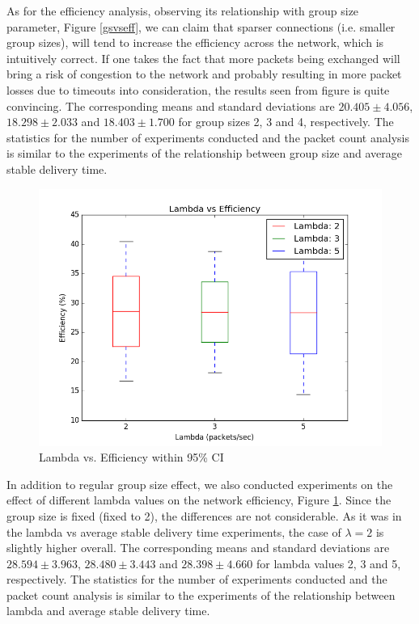 \documentclass[a4paper, 12pt]{article}
\begin{document}
As for the efficiency analysis, observing its relationship with group size parameter, Figure \ref{gsvseff}, we can claim that sparser connections (i.e. smaller group sizes), will tend to increase the efficiency across the network, which is intuitively correct. If one takes the fact that more packets being exchanged will bring a risk of congestion to the network and probably resulting in more packet losses due to timeouts into consideration, the results seen from figure is quite convincing. The corresponding means and standard deviations are $20.405 \pm 4.056$, $18.298 \pm 2.033$ and $18.403 \pm 1.700$ for group sizes 2, 3 and 4, respectively. The statistics for the number of experiments conducted and the packet count analysis is similar to the experiments of the relationship between group size and average stable delivery time.

\begin{figure}[h]
\centering
   \includegraphics[scale=0.45]{Lambda_vs_Eff_Final.png}
   \caption{Lambda vs. Efficiency within 95\% CI}
   \label{lbvseff}
\end{figure}

In addition to regular group size effect, we also conducted experiments on the effect of different lambda values on the network efficiency, Figure \ref{lbvseff}. Since the group size is fixed (fixed to 2), the differences are not considerable. As it was in the lambda vs average stable delivery time experiments, the case of $\lambda = 2$ is slightly higher overall. The corresponding means and standard deviations are $28.594 \pm 3.963$, $28.480 \pm 3.443$ and $28.398 \pm 4.660$ for lambda values 2, 3 and 5, respectively. The statistics for the number of experiments conducted and the packet count analysis is similar to the experiments of the relationship between lambda and average stable delivery time.
\end{document}
